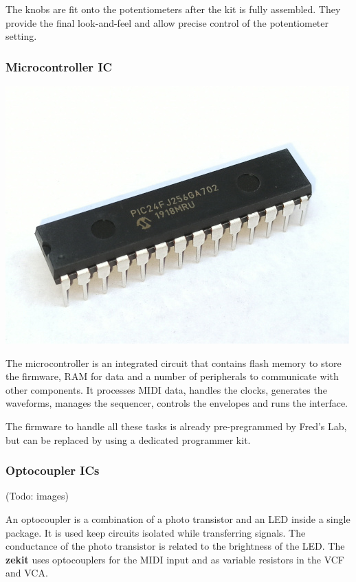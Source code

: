 \documentclass{scrartcl}
\begin{document}
The knobs are fit onto the potentiometers after the kit is fully assembled. They provide the final look-and-feel and allow precise control of the potentiometer setting.

\subsubsection{Microcontroller IC}

\begin{center}
    \includegraphics[scale=0.5]{assets/zekit-mcu-resized.jpg}
\end{center}

The microcontroller is an integrated circuit that contains flash memory to store the firmware, RAM for data and a number of peripherals to communicate with other components. It processes MIDI data, handles the clocks, generates the waveforms, manages the sequencer, controls the envelopes and runs the interface.

The firmware to handle all these tasks is already pre-pregrammed by Fred’s Lab, but can be replaced by using a dedicated programmer kit.

\subsubsection{Optocoupler ICs}

\begin{center}
    (Todo: images)
\end{center}

An optocoupler is a combination of a photo transistor and an LED inside a single package. It is used keep circuits isolated while transferring signals. The conductance of the photo transistor is related to the brightness of the LED. The \textbf{zekit} uses optocouplers for the MIDI input and as variable resistors in the VCF and VCA.
\end{document}
